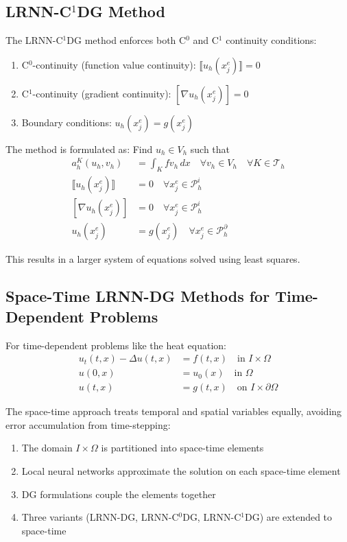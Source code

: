 \documentclass[11pt,a4paper]{article}
\begin{document}
\subsection{LRNN-C$^1$DG Method}

The LRNN-C$^1$DG method enforces both C$^0$ and C$^1$ continuity conditions:

\begin{enumerate}
    \item C$^0$-continuity (function value continuity): $\llbracket u_h(x_j^e) \rrbracket = 0$
    \item C$^1$-continuity (gradient continuity): $[\nabla u_h(x_j^e)] = 0$
    \item Boundary conditions: $u_h(x_j^e) = g(x_j^e)$
\end{enumerate}

The method is formulated as: Find $u_h \in V_h$ such that
\begin{align}
a_h^K(u_h, v_h) &= \int_K f v_h \, dx \quad \forall v_h \in V_h \quad \forall K \in \mathcal{T}_h\\
\llbracket u_h(x_j^e) \rrbracket &= 0 \quad \forall x_j^e \in \mathcal{P}_h^i\\
[\nabla u_h(x_j^e)] &= 0 \quad \forall x_j^e \in \mathcal{P}_h^i\\
u_h(x_j^e) &= g(x_j^e) \quad \forall x_j^e \in \mathcal{P}_h^{\partial}
\end{align}

This results in a larger system of equations solved using least squares.

\subsection{Space-Time LRNN-DG Methods for Time-Dependent Problems}

For time-dependent problems like the heat equation:
\begin{align}
u_t(t,x) - \Delta u(t,x) &= f(t,x) \quad \text{in } I \times \Omega\\
u(0,x) &= u_0(x) \quad \text{in } \Omega\\
u(t,x) &= g(t,x) \quad \text{on } I \times \partial\Omega
\end{align}

The space-time approach treats temporal and spatial variables equally, avoiding error accumulation from time-stepping:

\begin{enumerate}
    \item The domain $I \times \Omega$ is partitioned into space-time elements
    \item Local neural networks approximate the solution on each space-time element
    \item DG formulations couple the elements together
    \item Three variants (LRNN-DG, LRNN-C$^0$DG, LRNN-C$^1$DG) are extended to space-time
\end{enumerate}
\end{document}
